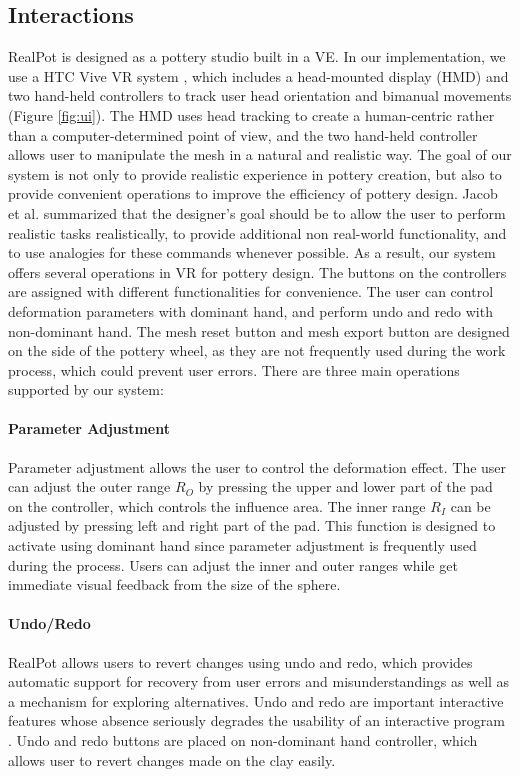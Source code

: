 \documentclass{svjour3}                     %
\begin{document}
\subsection{Interactions}
\label{sec:interactions}

RealPot is designed as a pottery studio built in a VE.
In our implementation, we use a HTC Vive VR system \cite{website:vive}, which includes a head-mounted display (HMD) and two hand-held controllers to track user head orientation and bimanual movements (Figure \ref{fig:ui}).
The HMD uses head tracking to create a human-centric rather than a computer-determined point of view, and the two hand-held controller allows user to manipulate the mesh in a natural and realistic way.
The goal of our system is not only to provide realistic experience in pottery creation, but also to provide convenient operations to improve the efficiency of pottery design. 
Jacob et al. \cite{Jacob2008Reality} summarized that the designer's goal should be to allow the user to perform realistic tasks realistically, to provide additional non real-world functionality, and to use analogies for these commands whenever possible.
As a result, our system offers several operations in VR for pottery design.
The buttons on the controllers are assigned with different functionalities for convenience. The user can control deformation parameters with dominant hand, and perform undo and redo with non-dominant hand.
The mesh reset button and mesh export button are designed on the side of the pottery wheel, as they are not frequently used during the work process, which could prevent user errors.
There are three main operations supported by our system:

\paragraph{Parameter Adjustment}
Parameter adjustment allows the user to control the deformation effect.
The user can adjust the outer range $R_{O}$ by pressing the upper and lower part of the pad on the controller, which controls the influence area. The inner range $R_{I}$ can be adjusted by pressing left and right part of the pad. This function is designed to activate using dominant hand since parameter adjustment is frequently used during the process. Users can adjust the inner and outer ranges while get immediate visual feedback from the size of the sphere.

\paragraph{Undo/Redo}
RealPot allows users to revert changes using undo and redo, which provides automatic support for recovery from user errors and misunderstandings as well as a mechanism for exploring alternatives.
Undo and redo are important interactive features whose absence seriously degrades the usability of an interactive program \cite{choudhary1995general}.
Undo and redo buttons are placed on non-dominant hand controller, which allows user to revert changes made on the clay easily.
\end{document}
